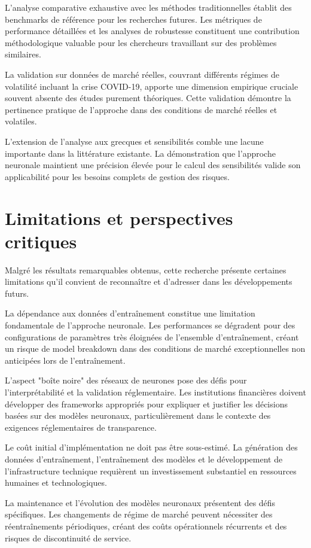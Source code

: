 L'analyse comparative exhaustive avec les méthodes traditionnelles établit des benchmarks de référence pour les recherches futures. Les métriques de performance détaillées et les analyses de robustesse constituent une contribution méthodologique valuable pour les chercheurs travaillant sur des problèmes similaires.

La validation sur données de marché réelles, couvrant différents régimes de volatilité incluant la crise COVID-19, apporte une dimension empirique cruciale souvent absente des études purement théoriques. Cette validation démontre la pertinence pratique de l'approche dans des conditions de marché réelles et volatiles.

L'extension de l'analyse aux grecques et sensibilités comble une lacune importante dans la littérature existante. La démonstration que l'approche neuronale maintient une précision élevée pour le calcul des sensibilités valide son applicabilité pour les besoins complets de gestion des risques.

\section{Limitations et perspectives critiques}

Malgré les résultats remarquables obtenus, cette recherche présente certaines limitations qu'il convient de reconnaître et d'adresser dans les développements futurs.

La dépendance aux données d'entraînement constitue une limitation fondamentale de l'approche neuronale. Les performances se dégradent pour des configurations de paramètres très éloignées de l'ensemble d'entraînement, créant un risque de model breakdown dans des conditions de marché exceptionnelles non anticipées lors de l'entraînement.

L'aspect "boîte noire" des réseaux de neurones pose des défis pour l'interprétabilité et la validation réglementaire. Les institutions financières doivent développer des frameworks appropriés pour expliquer et justifier les décisions basées sur des modèles neuronaux, particulièrement dans le contexte des exigences réglementaires de transparence.

Le coût initial d'implémentation ne doit pas être sous-estimé. La génération des données d'entraînement, l'entraînement des modèles et le développement de l'infrastructure technique requièrent un investissement substantiel en ressources humaines et technologiques.

La maintenance et l'évolution des modèles neuronaux présentent des défis spécifiques. Les changements de régime de marché peuvent nécessiter des réentraînements périodiques, créant des coûts opérationnels récurrents et des risques de discontinuité de service.

